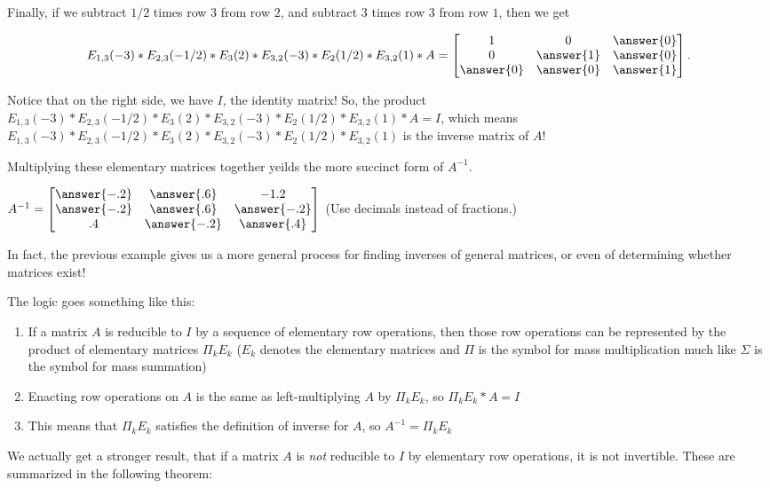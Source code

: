 \documentclass{ximera}
\begin{document}
\begin{example}
Finally, if we subtract $1/2$ times row $3$ from row $2$, and subtract $3$ times row $3$ from row $1$, then we get

$$E_{1,3}(-3)*E_{2,3}(-1/2)*E_{3}(2)*E_{3,2}(-3)*E_{2}(1/2)*E_{3,2}(1)*A=\begin{bmatrix}
  1&0&\answer{0}\\0&\answer{1}&\answer{0}\\\answer{0}&\answer{0}&\answer{1}
  \end{bmatrix}.$$

Notice that on the right side, we have $I$, the identity matrix! So, the product $E_{1,3}(-3)*E_{2,3}(-1/2)*E_{3}(2)*E_{3,2}(-3)*E_{2}(1/2)*E_{3,2}(1)*A=I$, which means $E_{1,3}(-3)*E_{2,3}(-1/2)*E_{3}(2)*E_{3,2}(-3)*E_{2}(1/2)*E_{3,2}(1)$ is the inverse matrix of $A$!

Multiplying these elementary matrices together yeilds the more succinct form of $A^{-1}$.

$A^{-1}=\begin{bmatrix}
  \answer{-.2}&\answer{.6}&-1.2\\\answer{-.2}&\answer{.6}&\answer{-.2}\\.4&\answer{-.2}&\answer{.4}
\end{bmatrix}$ (Use decimals instead of fractions.)

\end{example}

In fact, the previous example gives us a more general process for finding inverses of general matrices, or even of determining whether matrices exist! 

The logic goes something like this: 

\begin{enumerate}
\item If a matrix $A$ is reducible to $I$ by a sequence of elementary row operations, then those row operations can be represented by the product of elementary matrices $\Pi_{k}E_k$ ($E_k$ denotes the elementary matrices and $\Pi$ is the symbol for mass multiplication much like $\Sigma$ is the symbol for mass summation)
\item Enacting row operations on $A$ is the same as left-multiplying $A$ by $\Pi_{k}E_k$, so $\Pi_{k}E_k*A=I$
\item This means that $\Pi_{k}E_k$ satisfies the definition of inverse for $A$, so $A^{-1}=\Pi_{k}E_k$
\end{enumerate}

We actually get a stronger result, that if a matrix $A$ is \emph{not} reducible to $I$ by elementary row operations, it is not invertible. These are summarized in the following theorem:
\end{document}
